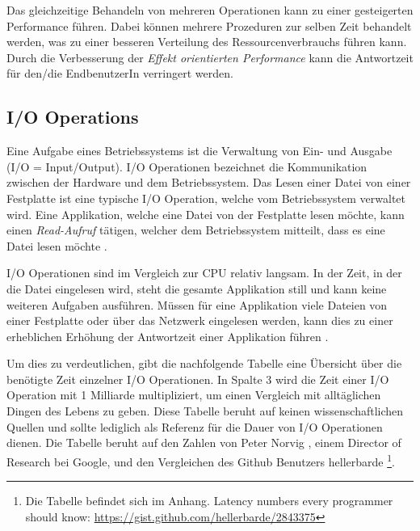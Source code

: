 Das gleichzeitige Behandeln von mehreren Operationen kann zu einer gesteigerten Performance führen. Dabei können mehrere Prozeduren zur selben Zeit behandelt werden, was zu einer besseren Verteilung des Ressourcenverbrauchs führen kann. Durch die Verbesserung der \emph{Effekt orientierten Performance} kann die Antwortzeit für den/die EndbenutzerIn verringert werden.

\subsection{I/O Operations}
\label{subsection: io_operationen}

Eine Aufgabe eines Betriebssystems ist die Verwaltung von Ein- und Ausgabe (I/O = Input/Output). I/O Operationen bezeichnet die Kommunikation zwischen der Hardware und dem Betriebssystem. Das Lesen einer Datei von einer Festplatte ist eine typische I/O Operation, welche vom Betriebssystem verwaltet wird. Eine Applikation, welche eine Datei von der Festplatte lesen möchte, kann einen \emph{Read-Aufruf} tätigen, welcher dem Betriebssystem mitteilt, dass es eine Datei lesen möchte \cite[p. 292]{tan09}.

I/O Operationen sind im Vergleich zur CPU relativ langsam. In der Zeit, in der die Datei eingelesen wird, steht die gesamte Applikation still und kann keine weiteren Aufgaben ausführen. Müssen für eine Applikation viele Dateien von einer Festplatte oder über das Netzwerk eingelesen werden, kann dies zu einer erheblichen Erhöhung der Antwortzeit einer Applikation führen \cite[p. 307]{tan09}. 

Um dies zu verdeutlichen, gibt die nachfolgende Tabelle eine Übersicht über die benötigte Zeit einzelner I/O Operationen. In Spalte 3 wird die Zeit einer I/O Operation mit 1 Milliarde multipliziert, um einen Vergleich mit alltäglichen Dingen des Lebens zu geben. Diese Tabelle beruht auf keinen wissenschaftlichen Quellen und sollte lediglich als Referenz für die Dauer von I/O Operationen dienen. Die Tabelle beruht auf den Zahlen von Peter Norvig \cite[]{Nor98}, einem Director of Research bei Google, und den Vergleichen des Github Benutzers hellerbarde \footnote{Die Tabelle befindet sich im Anhang. Latency numbers every programmer should know: \url{https://gist.github.com/hellerbarde/2843375}}.
